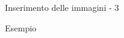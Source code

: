 \begin{frame}[fragile]{Inserimento delle immagini - 3}
	
\begin{exampleblock}{Esempio}
	
\end{exampleblock}

\end{frame}